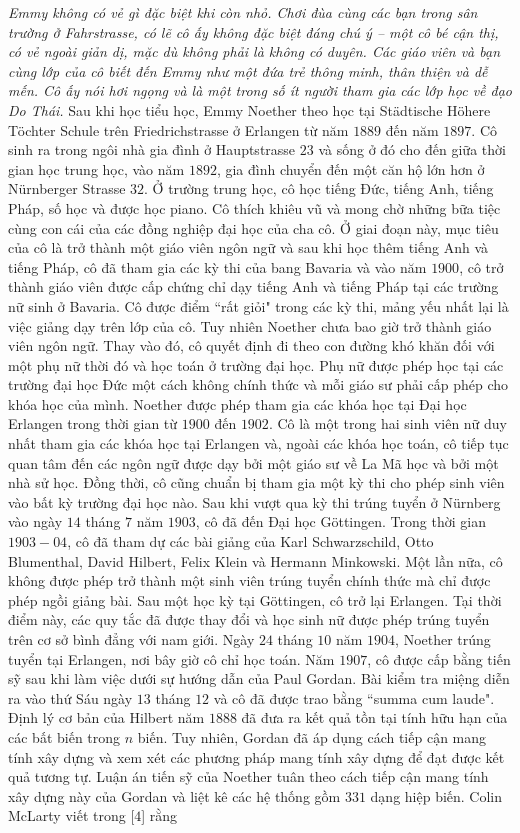 \begin{multicols}{2}
	\vskip 0.05cm
	\textit{Emmy không có vẻ gì đặc biệt khi còn nhỏ. Chơi đùa cùng các bạn trong sân trường ở Fahrstrasse, có lẽ cô ấy không đặc biệt đáng chú ý -- một cô bé cận thị, có vẻ ngoài giản dị, mặc dù không phải là không có duyên. Các giáo viên và bạn cùng lớp của cô biết đến Emmy như một đứa trẻ thông minh, thân thiện và dễ mến. Cô ấy nói hơi ngọng và là một trong số ít người tham gia các lớp học về đạo Do Thái.}
	\vskip 0.05cm
	Sau khi học tiểu học, Emmy Noether theo học tại Städtische Höhere Töchter Schule trên Friedrichstrasse ở Erlangen từ năm $1889$ đến năm $1897$. Cô sinh ra trong ngôi nhà gia đình ở Hauptstrasse $23$ và sống ở đó cho đến giữa thời gian học trung học, vào năm $1892$, gia đình chuyển đến một căn hộ lớn hơn ở Nürnberger Strasse $32$. Ở trường trung học, cô học tiếng Đức, tiếng Anh, tiếng Pháp, số học và được học piano. Cô thích khiêu vũ và mong chờ những bữa tiệc cùng con cái của các đồng nghiệp đại học của cha cô. Ở giai đoạn này, mục tiêu của cô là trở thành một giáo viên ngôn ngữ và sau khi học thêm tiếng Anh và tiếng Pháp, cô đã tham gia các kỳ thi của bang Bavaria và vào năm $1900$, cô trở thành giáo viên được cấp chứng chỉ dạy tiếng Anh và tiếng Pháp tại các trường nữ sinh ở Bavaria. Cô được điểm ``rất giỏi" trong các kỳ thi, mảng yếu nhất lại là việc giảng dạy trên lớp của cô.
	\vskip 0.05cm
	Tuy nhiên Noether chưa bao giờ trở thành giáo viên ngôn ngữ. Thay vào đó, cô quyết định đi theo con đường khó khăn đối với một phụ nữ thời đó và học toán ở trường đại học. Phụ nữ được phép học tại các trường đại học Đức một cách không chính thức và mỗi giáo sư phải cấp phép cho khóa học của mình. Noether được phép tham gia các khóa học tại Đại học Erlangen trong thời gian từ $1900$ đến $1902$. Cô là một trong hai sinh viên nữ duy nhất tham gia các khóa học tại Erlangen và, ngoài các khóa học toán, cô tiếp tục quan tâm đến các ngôn ngữ được dạy bởi một giáo sư về La Mã học và bởi một nhà sử học. Đồng thời, cô cũng chuẩn bị tham gia một kỳ thi cho phép sinh viên vào bất kỳ trường đại học nào. Sau khi vượt qua kỳ thi trúng tuyển ở Nürnberg vào ngày $14$ tháng $7$ năm $1903$, cô đã đến Đại học Göttingen. Trong thời gian $1903-04$, cô đã tham dự các bài giảng của Karl Schwarzschild, Otto Blumenthal, David Hilbert, Felix Klein và Hermann Minkowski. Một lần nữa, cô không được phép trở thành một sinh viên trúng tuyển chính thức mà chỉ được phép ngồi giảng bài. Sau một học kỳ tại Göttingen, cô trở lại Erlangen.
	\vskip 0.05cm
	Tại thời điểm này, các quy tắc đã được thay đổi và học sinh nữ được phép trúng tuyển trên cơ sở bình đẳng với nam giới. Ngày $24$ tháng $10$ năm $1904$, Noether trúng tuyển tại Erlangen, nơi bây giờ cô chỉ học toán. Năm $1907$, cô được cấp bằng tiến sỹ sau khi làm việc dưới sự hướng dẫn của Paul Gordan. Bài kiểm tra miệng diễn ra vào thứ Sáu ngày $13$ tháng $12$ và cô đã được trao bằng ``summa cum laude". Định lý cơ bản của Hilbert năm $1888$ đã đưa ra kết quả tồn tại tính hữu hạn của các bất biến trong $n$ biến. Tuy nhiên, Gordan đã áp dụng cách tiếp cận mang tính xây dựng và xem xét các phương pháp mang tính xây dựng để đạt được kết quả tương tự. Luận án tiến sỹ của Noether tuân theo cách tiếp cận mang tính xây dựng này của Gordan và liệt kê các hệ thống gồm $331$ dạng hiệp biến. Colin McLarty viết trong [$4$] rằng

\end{multicols}
